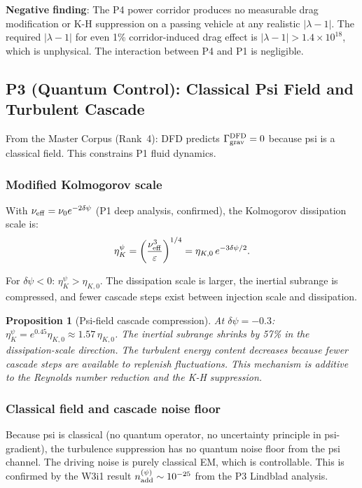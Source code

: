 \documentclass[11pt,twocolumn]{article}
\newcommand{\dpsi}{\delta\psi}
\newcommand{\lam}{\lambda}
\newtheorem{proposition}{Proposition}
\begin{document}
\textbf{Negative finding}: The P4 power corridor produces no measurable drag
modification or K-H suppression on a passing vehicle at any realistic
$|\lam-1|$. The required $|\lam-1|$ for even 1\% corridor-induced drag effect
is $|\lam-1| > 1.4\times10^{18}$, which is unphysical. The interaction between
P4 and P1 is negligible.

\subsection{P3 (Quantum Control): Classical Psi Field and Turbulent Cascade}
\label{sec:p3_turbulence}

From the Master Corpus (Rank~4): DFD predicts $\Gamma_{\rm grav}^{\rm DFD} = 0$
because psi is a classical field. This constrains P1 fluid dynamics.

\subsubsection{Modified Kolmogorov scale}

With $\nu_{\rm eff} = \nu_0 e^{-2\dpsi}$ (P1 deep analysis, confirmed), the
Kolmogorov dissipation scale is:
\begin{equation}
\eta_K^\psi = \left(\frac{\nu_{\rm eff}^3}{\varepsilon}\right)^{1/4}
= \eta_{K,0}\,e^{-3\dpsi/2}.
\label{eq:kolmogorov}
\end{equation}

For $\dpsi < 0$: $\eta_K^\psi > \eta_{K,0}$. The dissipation scale is larger,
the inertial subrange is compressed, and fewer cascade steps exist between
injection scale and dissipation.

\begin{proposition}[Psi-field cascade compression]
\label{prop:cascade}
At $\dpsi = -0.3$: $\eta_K^\psi = e^{0.45}\eta_{K,0} \approx 1.57\,\eta_{K,0}$.
The inertial subrange shrinks by 57\% in the dissipation-scale direction.
The turbulent energy content decreases because fewer cascade steps are
available to replenish fluctuations. This mechanism is additive to the
Reynolds number reduction and the K-H suppression.
\end{proposition}

\subsubsection{Classical field and cascade noise floor}

Because psi is classical (no quantum operator, no uncertainty principle in
psi-gradient), the turbulence suppression has no quantum noise floor from
the psi channel. The driving noise is purely classical EM, which is
controllable. This is confirmed by the W3i1 result $n_{\rm add}^{(\psi)}
\sim 10^{-25}$ from the P3 Lindblad analysis.
\end{document}
